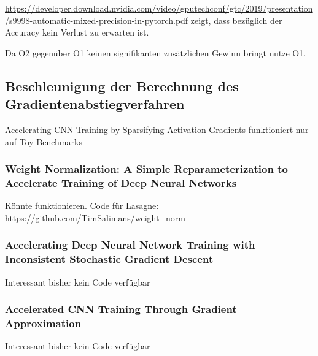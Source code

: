\url{https://developer.download.nvidia.com/video/gputechconf/gtc/2019/presentation/s9998-automatic-mixed-precision-in-pytorch.pdf} zeigt, dass bezüglich der Accuracy kein Verlust zu erwarten ist.

Da O2 gegenüber O1 keinen signifikanten zusätzlichen Gewinn bringt nutze O1.
\subsection{Beschleunigung der Berechnung des Gradientenabstiegverfahren}


Accelerating CNN Training by Sparsifying Activation Gradients funktioniert nur auf Toy-Benchmarks 


\subsubsection{Weight Normalization: A Simple Reparameterization
to Accelerate Training of Deep Neural Networks}

Könnte funktionieren. Code für Lasagne: https://github.com/TimSalimans/weight\_norm


\subsubsection{Accelerating Deep Neural Network Training with Inconsistent Stochastic Gradient Descent}

Interessant bisher kein Code verfügbar

\subsubsection{Accelerated CNN Training Through Gradient Approximation }

Interessant bisher kein Code verfügbar


